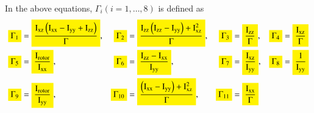 \documentclass[3p]{elsarticle}
\begin{document}
In the above equations, $\Gamma_i (i = 1, \ldots, 8)$ is defined as
\begin{equation}
    \begin{aligned}
        \colorbox{yellow}{$\Gamma_1$} &= \colorbox{yellow}{$\dfrac{\mathrm{I}_{\text{xz}}\left(\mathrm{I}_{\text{xx}} - \mathrm{I}_{\text{yy}} + \mathrm{I}_{\text{zz}}\right)}{\mathrm{\Gamma}}$}, & \colorbox{yellow}{$\Gamma_2$} &= \colorbox{yellow}{$\dfrac{\mathrm{I}_{\text{zz}}\left(\mathrm{I}_{\text{zz}} - \mathrm{I}_{\text{yy}}\right)+\mathrm{I}_{\text{xz}}^2}{\mathrm{\Gamma}}$}, & \colorbox{yellow}{$\Gamma_3$} &= \colorbox{yellow}{$\dfrac{\mathrm{I}_{\text{zz}}}{\mathrm{\Gamma}}$}, & \colorbox{yellow}{$\Gamma_4$} &= \colorbox{yellow}{$\dfrac{\mathrm{I}_{\text{xz}}}{\mathrm{\Gamma}}$} \\
        \colorbox{yellow}{$\Gamma_5$} &= \colorbox{yellow}{$\dfrac{\mathrm{I}_{\text{rotor}}}{\mathrm{I}_{\text{xx}}}$}, & \colorbox{yellow}{$\Gamma_6$} &= \colorbox{yellow}{$\dfrac{\mathrm{I}_{\text{zz}}-\mathrm{I}_{\text{xx}}}{\mathrm{I}_{\text{yy}}}$}, & \colorbox{yellow}{$\Gamma_7$} &= \colorbox{yellow}{$\dfrac{\mathrm{I}_{\text{xz}}}{\mathrm{I}_{\text{yy}}}$}, & \colorbox{yellow}{$\Gamma_8$} &= \colorbox{yellow}{$\dfrac{1}{\mathrm{I}_{\text{yy}}}$} \\
        \colorbox{yellow}{$\Gamma_9$} &= \colorbox{yellow}{$\dfrac{\mathrm{I}_{\text{rotor}}}{\mathrm{I}_{\text{yy}}}$}, & \colorbox{yellow}{$\Gamma_{10}$} &= \colorbox{yellow}{$\dfrac{\left(\mathrm{I}_{\text{xx}}-\mathrm{I}_{\text{yy}}\right)+\mathrm{I}_{\text{xz}}^2}{\mathrm{\Gamma}}$}, & \colorbox{yellow}{$\Gamma_{11}$} &= \colorbox{yellow}{$\dfrac{\mathrm{I}_{\text{xx}}}{\mathrm{\Gamma}}$} &
    \end{aligned}
\end{equation}
\end{document}
